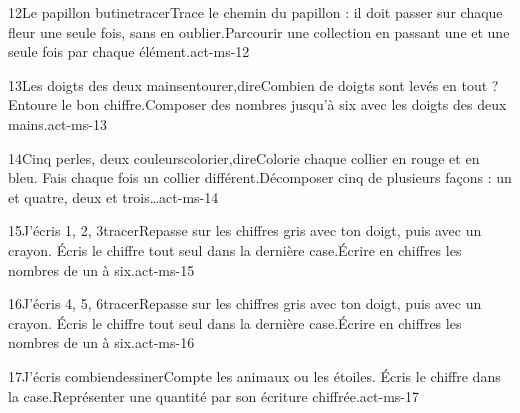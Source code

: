 \begin{activite}{12}{Le papillon butine}{tracer}{Trace le chemin du papillon : il doit passer sur {\otBold\color{otNavy}chaque fleur une seule fois}, sans en oublier.}{Parcourir une collection en passant une et une seule fois par chaque élément.}{act-ms-12}
\end{activite}
\begin{activite}{13}{Les doigts des deux mains}{entourer,dire}{Combien de doigts sont levés en tout ? Entoure le {\otBold\color{otNavy}bon chiffre}.}{Composer des nombres jusqu’à six avec les doigts des deux mains.}{act-ms-13}
\end{activite}
\begin{activite}{14}{Cinq perles, deux couleurs}{colorier,dire}{Colorie chaque collier en rouge et en bleu. Fais {\otBold\color{otNavy}chaque fois} un collier différent.}{Décomposer cinq de plusieurs façons : un et quatre, deux et trois…}{act-ms-14}
\end{activite}
\begin{activite}{15}{J’écris 1, 2, 3}{tracer}{Repasse sur les chiffres gris avec ton doigt, puis avec un crayon. Écris le chiffre {\otBold\color{otNavy}tout seul} dans la dernière case.}{Écrire en chiffres les nombres de un à six.}{act-ms-15}
\end{activite}
\begin{activite}{16}{J’écris 4, 5, 6}{tracer}{Repasse sur les chiffres gris avec ton doigt, puis avec un crayon. Écris le chiffre {\otBold\color{otNavy}tout seul} dans la dernière case.}{Écrire en chiffres les nombres de un à six.}{act-ms-16}
\end{activite}
\begin{activite}{17}{J’écris combien}{dessiner}{Compte les animaux ou les étoiles. {\otBold\color{otNavy}Écris le chiffre} dans la case.}{Représenter une quantité par son écriture chiffrée.}{act-ms-17}
\end{activite}
